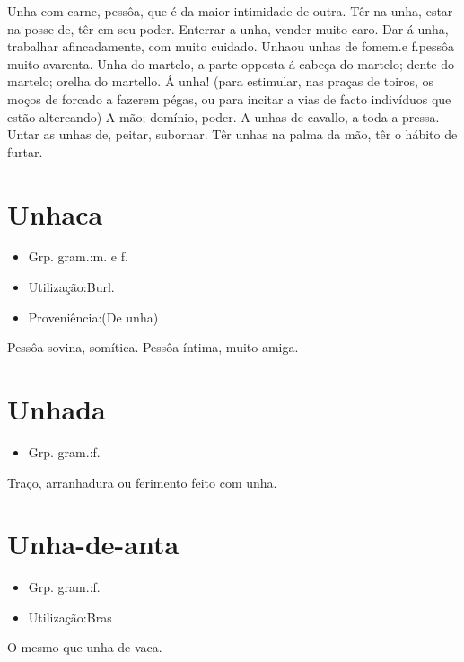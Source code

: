 \documentclass{article}
\begin{document}
\textunderscore Unha com carne\textunderscore , pessôa, que é da maior intimidade de outra.
\textunderscore Têr na unha\textunderscore , estar na posse de, têr em seu poder.
\textunderscore Enterrar a unha\textunderscore , vender muito caro.
\textunderscore Dar á unha\textunderscore , trabalhar afincadamente, com muito cuidado.
\textunderscore Unha\textunderscore  ou \textunderscore unhas de fome\textunderscore  \textunderscore m.\textunderscore  e \textunderscore f.\textunderscore  pessôa muito avarenta.
\textunderscore Unha do martelo\textunderscore , a parte opposta á cabeça do martelo; dente do martelo; orelha do martello.
\textunderscore Á unha\textunderscore ! (para estimular, nas praças de toiros, os moços de forcado a fazerem pégas, ou para incitar a vias de facto indivíduos que estão altercando)
A mão; domínio, poder.
\textunderscore A unhas de cavallo\textunderscore , a toda a pressa.
\textunderscore Untar as unhas de\textunderscore , peitar, subornar.
\textunderscore Têr unhas na palma da mão\textunderscore , têr o hábito de furtar.
\section{Unhaca}
\begin{itemize}
\item {Grp. gram.:m.  e  f.}
\end{itemize}
\begin{itemize}
\item {Utilização:Burl.}
\end{itemize}
\begin{itemize}
\item {Proveniência:(De \textunderscore unha\textunderscore )}
\end{itemize}
Pessôa sovina, somítica.
Pessôa íntima, muito amiga.
\section{Unhada}
\begin{itemize}
\item {Grp. gram.:f.}
\end{itemize}
Traço, arranhadura ou ferimento feito com unha.
\section{Unha-de-anta}
\begin{itemize}
\item {Grp. gram.:f.}
\end{itemize}
\begin{itemize}
\item {Utilização:Bras}
\end{itemize}
O mesmo que \textunderscore unha-de-vaca\textunderscore .
\end{document}
